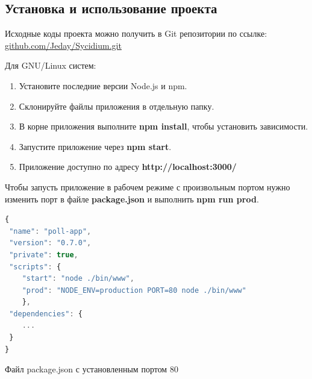 \subsection{Установка и использование проекта}  
Исходные коды проекта можно получить в Git репозитории по ссылке:
\href{https://github.com/Jeday/Sycidium.git}{github.com/Jeday/Sycidium.git}

Для GNU/Linux систем:
\begin{enumerate}
	\item Установите последние версии Node.js и npm.
	\item Склонируйте файлы приложения в отдельную папку.
	\item В корне приложения выполните \textbf{npm install}, чтобы установить зависимости.
	\item Запустите приложение через \textbf{npm start}.
	\item Приложение доступно по адресу \textbf{http://localhost:3000/}
\end{enumerate}

Чтобы запусть приложение в рабочем режиме с произвольным портом нужно изменить порт в файле \textbf{package.json} и выполнить \textbf{npm run prod}.
  \begin{ListingEnv}
 \begin{lstlisting}[language=JavaScript]
{
 "name": "poll-app",
 "version": "0.7.0",
 "private": true,
 "scripts": {
 	"start": "node ./bin/www",
 	"prod": "NODE_ENV=production PORT=80 node ./bin/www"
    },
 "dependencies": {
	...
 }
}

\end{lstlisting}
	\caption{Файл package.json с установленным портом 80}
\label{list:pack-json}
\end{ListingEnv}      



